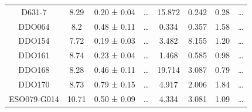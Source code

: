 \documentclass[reprint,%
 amsmath,amssymb,
 aps,
]{revtex4-1}
\begin{document}
\begin{table}[]
\begin{tabular}{cccccrrc}
\rowcolor[HTML]{F3F3F3} 
D631-7               & 8.29                      & 0.20 ± 0.04           & …                      & 15.872                                                       & 0.242                                                         & 0.28                                                           & …                                                             \\
\rowcolor[HTML]{F3F3F3} 
DDO064               & 8.2                       & 0.48 ± 0.11           & …                      & 0.334                                                        & 0.357                                                         & 1.58                                                           & …                                                             \\
\rowcolor[HTML]{F3F3F3} 
DDO154               & 7.72                      & 0.19 ± 0.03           & …                      & 3.482                                                        & 8.155                                                            & 1.20                                                          & …                                                             \\
\rowcolor[HTML]{F3F3F3} 
DDO161               & 8.74                      & 0.23 ± 0.04           & …                      & 1.468                                                        & 0.585                                                         & 0.98                                                           & …                                                             \\
\rowcolor[HTML]{F3F3F3} 
DDO168               & 8.28                      & 0.46 ± 0.11           & …                      & 19.714                                                       & 3.087                                                           & 0.79                                                          & …                                                             \\
\rowcolor[HTML]{F3F3F3} 
DDO170               & 8.73                      & 0.79 ± 0.15           & …                      & 4.917                                                        & 2.006                                                            & 1.84                                                           & …                                                             \\
\rowcolor[HTML]{F3F3F3} 
ESO079-G014          & 10.71                     & 0.50 ± 0.09           & …                      & 4.334                                                        & 3.081                                                          & 1.09                                                            & …                                                             \\

\end{tabular}
\end{table}
\end{document}
